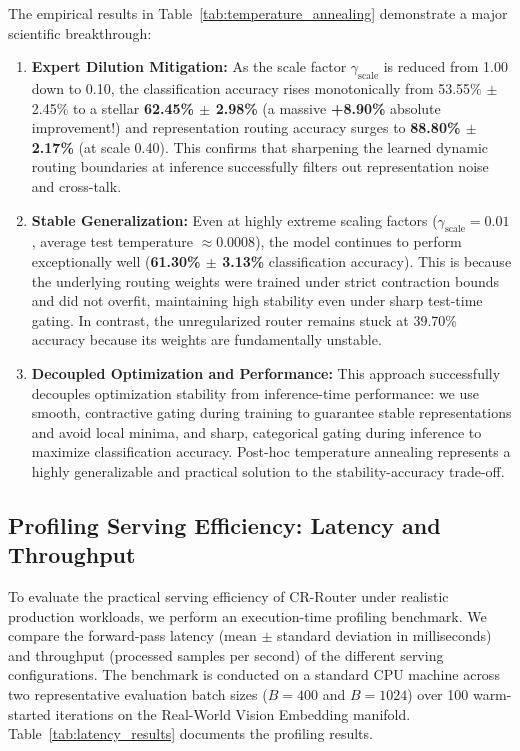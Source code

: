 The empirical results in Table~\ref{tab:temperature_annealing} demonstrate a major scientific breakthrough:
\begin{enumerate}
  \item \textbf{Expert Dilution Mitigation:} As the scale factor $\gamma_{\text{scale}}$ is reduced from 1.00 down to 0.10, the classification accuracy rises monotonically from 53.55\% $\pm$ 2.45\% to a stellar \textbf{62.45\% $\pm$ 2.98\%} (a massive \textbf{+8.90\%} absolute improvement!) and representation routing accuracy surges to \textbf{88.80\% $\pm$ 2.17\%} (at scale 0.40). This confirms that sharpening the learned dynamic routing boundaries at inference successfully filters out representation noise and cross-talk.
  \item \textbf{Stable Generalization:} Even at highly extreme scaling factors ($\gamma_{\text{scale}} = 0.01$, average test temperature $\approx 0.0008$), the model continues to perform exceptionally well (\textbf{61.30\% $\pm$ 3.13\%} classification accuracy). This is because the underlying routing weights were trained under strict contraction bounds and did not overfit, maintaining high stability even under sharp test-time gating. In contrast, the unregularized router remains stuck at 39.70\% accuracy because its weights are fundamentally unstable.
  \item \textbf{Decoupled Optimization and Performance:} This approach successfully decouples optimization stability from inference-time performance: we use smooth, contractive gating during training to guarantee stable representations and avoid local minima, and sharp, categorical gating during inference to maximize classification accuracy. Post-hoc temperature annealing represents a highly generalizable and practical solution to the stability-accuracy trade-off.
\end{enumerate}

\subsection{Profiling Serving Efficiency: Latency and Throughput}
To evaluate the practical serving efficiency of CR-Router under realistic production workloads, we perform an execution-time profiling benchmark. We compare the forward-pass latency (mean $\pm$ standard deviation in milliseconds) and throughput (processed samples per second) of the different serving configurations. The benchmark is conducted on a standard CPU machine across two representative evaluation batch sizes ($B = 400$ and $B = 1024$) over 100 warm-started iterations on the Real-World Vision Embedding manifold. Table~\ref{tab:latency_results} documents the profiling results.

